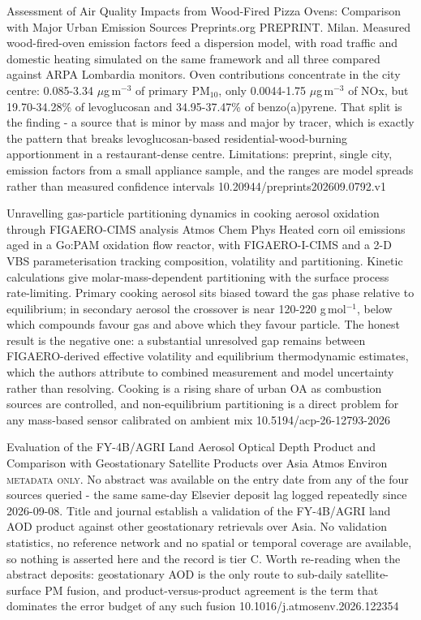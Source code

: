 \documentclass[10pt]{article}
\begin{document}
{Assessment of Air Quality Impacts from Wood-Fired Pizza Ovens: Comparison with Major Urban Emission Sources}
{Preprints.org}
{PREPRINT. Milan. Measured wood-fired-oven emission factors feed a dispersion model, with road traffic and domestic heating simulated on the same framework and all three compared against ARPA Lombardia monitors. Oven contributions concentrate in the city centre: 0.085-3.34 $\mu$g\,m$^{-3}$ of primary PM$_{10}$, only 0.0044-1.75 $\mu$g\,m$^{-3}$ of NOx, but 19.70-34.28\% of levoglucosan and 34.95-37.47\% of benzo(a)pyrene. That split is the finding - a source that is minor by mass and major by tracer, which is exactly the pattern that breaks levoglucosan-based residential-wood-burning apportionment in a restaurant-dense centre. Limitations: preprint, single city, emission factors from a small appliance sample, and the ranges are model spreads rather than measured confidence intervals}
{10.20944/preprints202609.0792.v1}


{Unravelling gas-particle partitioning dynamics in cooking aerosol oxidation through FIGAERO-CIMS analysis}
{Atmos Chem Phys}
{Heated corn oil emissions aged in a Go:PAM oxidation flow reactor, with FIGAERO-I-CIMS and a 2-D VBS parameterisation tracking composition, volatility and partitioning. Kinetic calculations give molar-mass-dependent partitioning with the surface process rate-limiting. Primary cooking aerosol sits biased toward the gas phase relative to equilibrium; in secondary aerosol the crossover is near 120-220 g\,mol$^{-1}$, below which compounds favour gas and above which they favour particle. The honest result is the negative one: a substantial unresolved gap remains between FIGAERO-derived effective volatility and equilibrium thermodynamic estimates, which the authors attribute to combined measurement and model uncertainty rather than resolving. Cooking is a rising share of urban OA as combustion sources are controlled, and non-equilibrium partitioning is a direct problem for any mass-based sensor calibrated on ambient mix}
{10.5194/acp-26-12793-2026}

{Evaluation of the FY-4B/AGRI Land Aerosol Optical Depth Product and Comparison with Geostationary Satellite Products over Asia}
{Atmos Environ}
{\textsc{metadata only.} No abstract was available on the entry date from any of the four sources queried - the same same-day Elsevier deposit lag logged repeatedly since 2026-09-08. Title and journal establish a validation of the FY-4B/AGRI land AOD product against other geostationary retrievals over Asia. No validation statistics, no reference network and no spatial or temporal coverage are available, so nothing is asserted here and the record is tier C. Worth re-reading when the abstract deposits: geostationary AOD is the only route to sub-daily satellite-surface PM fusion, and product-versus-product agreement is the term that dominates the error budget of any such fusion}
{10.1016/j.atmosenv.2026.122354}
\end{document}
